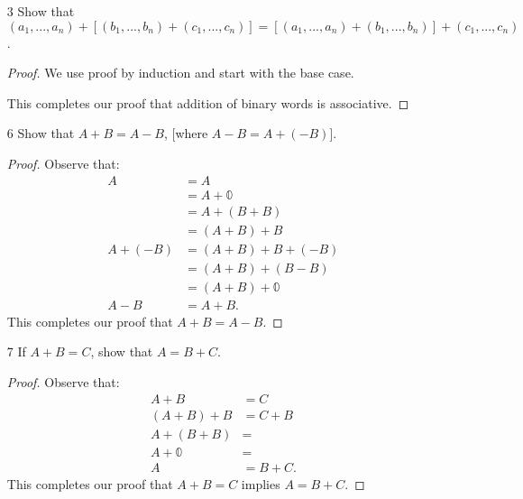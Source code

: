\documentclass[11pt, b5paper, draft, fleqn]{book}
\theoremstyle{remark}
\theoremstyle{plain}
\begin{document}
\begin{enumerate}
	\item[3] Show that \((a_1, ..., a_n) + \left[(b_1, ..., b_n) + (c_1, ..., c_n)\right] = \left[(a_1, ..., a_n) + (b_1, ..., b_n)\right] + (c_1, ..., c_n)\).
	\begin{proof}
		We use proof by induction and start with the base case.
		This completes our proof that addition of binary words is associative.
	\end{proof}
	
	\item[6] Show that \(A + B = A - B\), [where \(A - B = A + (-B)\)].
	\begin{proof}
		Observe that:
		\begin{equation*}
		\begin{split}
			A & = A \\
			& = A + \mathbb{0} \\
			& = A + (B + B) \\
			& = (A + B) + B \\
			A + (-B) & = (A + B) + B + (-B) \\
			& = (A + B) + (B - B) \\
			& = (A + B) + \mathbb{0} \\
			A - B & = A + B.
		\end{split}
		\end{equation*}
		This completes our proof that \(A + B = A - B\).
	\end{proof}
	
	\item[7] If \(A + B = C\), show that \(A = B + C\).
	\begin{proof}
		Observe that:
		\begin{equation*}
		\begin{split}
			A + B & = C \\
			(A + B) + B & = C + B \\
			A + (B + B) & = \\
			A + \mathbb{0} & = \\
			A & = B + C.
		\end{split}
		\end{equation*}
		This completes our proof that \(A + B = C\) implies \(A = B + C\).
	\end{proof}
\end{enumerate}
\end{document}
